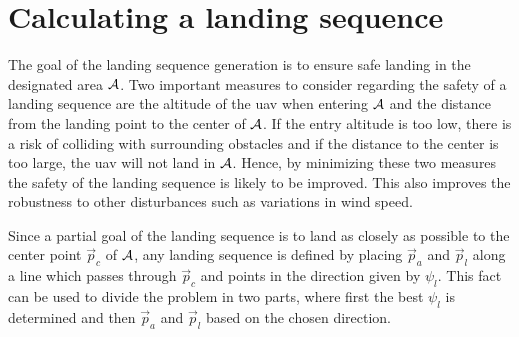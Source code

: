 \section{Calculating a landing sequence}
The goal of the landing sequence generation is to ensure safe landing in the designated area $\mathcal{A}$. Two important measures to 
consider regarding the safety of a landing sequence are the altitude of the \ac{uav} when entering $\mathcal{A}$ and the distance from the landing point to the center of $\mathcal{A}$. 
If the entry altitude is too low, there is a risk of colliding with surrounding obstacles and if the distance to the center is too large, the \ac{uav} will not land in $\mathcal{A}$. 
Hence, by minimizing these two measures the safety of the landing sequence is likely to be improved. This also improves the robustness to other disturbances such as 
variations in wind speed.

Since a partial goal of the landing sequence is to land as closely as possible to the center point $\vec{p}_c$ of $\mathcal{A}$, any 
landing sequence is defined by placing $\vec{p}_a$ and $\vec{p}_l$ along a line which passes through $\vec{p}_c$ and points in the direction given by $\psi_l$.
This fact can be used to divide the problem in two parts, where first the best $\psi_l$ is determined and then $\vec{p}_a$ and $\vec{p}_l$ based on the chosen direction.

